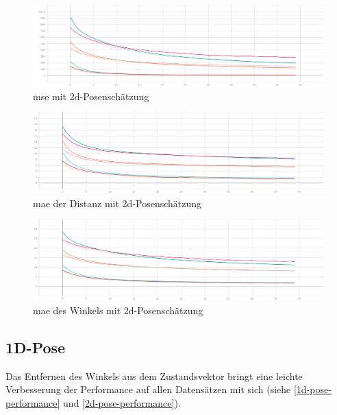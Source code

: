 \begin{figure}[H]
	\centering
	\includegraphics[width=\linewidth]{kapitel5/images/tensorboard/single-loss/Loss-single-loss.png}
	\caption{\acs{mse} mit \acs{2d}-Posenschätzung}
	\label{2d-poses-mse}
\end{figure}

\begin{figure}[H]
	\centering
	\includegraphics[width=\linewidth]{kapitel5/images/tensorboard/single-loss/Mean_Abs_Error_d-single-loss.png}
	\caption{\acs{mae} der Distanz mit \acs{2d}-Posenschätzung}
	\label{2d-poses-mae-d}
\end{figure}

\begin{figure}[H]
	\centering
	\includegraphics[width=\linewidth]{kapitel5/images/tensorboard/single-loss/Mean_Abs_Error_a-single-loss.png}
	\caption{\acs{mae} des Winkels mit \acs{2d}-Posenschätzung}
	\label{2d-poses-mae-a}
\end{figure}

\subsection{1D-Pose}

Das Entfernen des Winkels aus dem Zustandsvektor bringt eine leichte Verbesserung der Performance auf allen Datensätzen mit sich (siehe \ref{1d-pose-performance} und \ref{2d-pose-performance}). 


